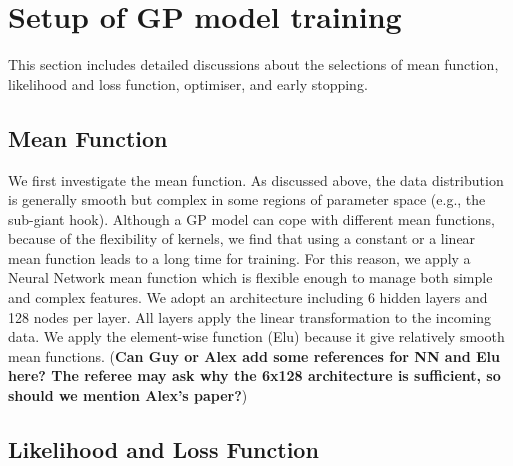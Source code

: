 \appendix{}

\section{Setup of GP model training}\label{app:A}

This section includes detailed discussions about the selections of mean function, likelihood and loss function, optimiser, and early stopping. 

\subsection{Mean Function}

We first investigate the mean function. As discussed above, the data distribution is generally smooth but complex in some regions of parameter space (e.g., the sub-giant hook).  Although a GP model can cope with different mean functions,  because of the flexibility of kernels, we find that using a constant or a linear mean function leads to a long time for training. For this reason, we apply a Neural Network mean function which is flexible enough to manage both simple and complex features. We adopt an architecture including 6 hidden layers and 128 nodes per layer. All layers apply the linear transformation to the incoming data. We apply the element-wise function (Elu) because it give relatively smooth mean functions. ({\bf Can Guy or Alex add some references for NN and Elu here? The referee may ask why the 6x128 architecture is sufficient, so should we mention Alex's paper?})

\subsection{Likelihood and Loss Function}

